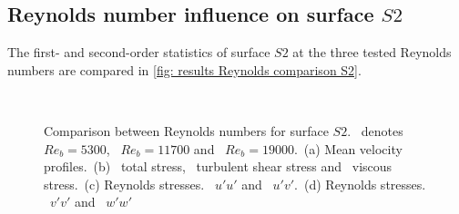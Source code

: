 \subsection{Reynolds number influence on surface $S2$}\label{subsec: Reynolds comp S2}
The first- and second-order statistics of surface $S2$ at the three tested Reynolds numbers are compared in \autoref{fig: results Reynolds comparison S2}.
\begin{figure}[h]
    \centering
    \begin{subfigure}{0.495\textwidth}
        \centering
        \subcaption{}
        
        \label{subfig: Reynolds comp S2 velocity}
    \end{subfigure}
    \hfill
    \begin{subfigure}{0.495\textwidth}
        \centering
        \subcaption{}
        
        \label{subfig: Reynolds comp S2 total stress}
    \end{subfigure}
    \plotverticalspacing
    \begin{subfigure}{0.495\textwidth}
        \centering
        \subcaption{}
        
        \label{subfig: Reynolds comp S2 Reynolds stresses uu}
    \end{subfigure}
    \hfill
    \begin{subfigure}{0.495\textwidth}
        \centering
        \subcaption{}
        
        \label{subfig: Reynolds comp S2 Reynolds stresses vv}
    \end{subfigure} 
    \\[-10pt]  
    \caption[Comparison of surface $S2$ with different Reynolds numbers]{Comparison between Reynolds numbers for surface $S2$.  \sTwoFiveThreeSymbol\ denotes $Re_b = 5300$, \sTwoElevenSevenSymbol \ $Re_b = 11700$ and \sTwoNineteenSymbol\ $Re_b = 19000$.~(a) Mean velocity profiles.~(b) \lsTotalStressSymbol \ total stress, \lsReynoldsStressSymbol \ turbulent shear stress and \lsViscousStressSymbol\ viscous stress.~(c) Reynolds stresses. \lsRuuSymbol \ $u'u'$ and \lsRuvSymbol \ $u'v'$.~(d) Reynolds stresses. \lsRvvSymbol \ $v'v'$ and \lsRwwSymbol \ $w'w'$}
    \label{fig: results Reynolds comparison S2}
\end{figure}


